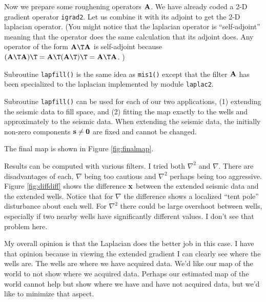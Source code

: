 \par
Now we prepare some roughening operators $\bold A$.
We have already coded a 2-D gradient operator
\texttt{igrad2}.
Let us combine it with its adjoint to get the 2-D laplacian operator.
(You might notice that the laplacian operator is ``self-adjoint'' meaning
that the operator does the same calculation that its adjoint does.
Any operator of the form $\bold A\T\bold A$ is self-adjoint because
$(\bold A\T\bold A)\T=\bold A\T (\bold A\T)\T=\bold A\T\bold A$. )
\par
{} 
Subroutine \texttt{lapfill()}
is the same idea as \texttt{mis1()}
except that 
the filter $\bold A$ has been specialized to the 
laplacian
implemented by module \texttt{laplac2}.



\par
Subroutine \texttt{lapfill()}
can be used for each of our two applications,
(1) extending the seismic data to fill space, and
(2) fitting the map exactly to the wells and approximately to the seismic data.
When extending the seismic data,
the initially non-zero components $\bold s \ne \bold 0$ are fixed
and cannot be changed.
\begin{comment}
That is done by calling
\texttt{lapfill()} with \texttt{mfixed=(s/=0.)}.
When extending wells,
the initially non-zero components $\bold w \ne \bold 0$ are fixed
and cannot be changed.
That is done by calling
\texttt{lapfill()} with \texttt{mfixed=(w/=0.)}.
\end{comment}

\par
The final map is shown in Figure \ref{fig:finalmap}.

\par
Results can be computed with various filters.
I tried both $\nabla^2$ and $\nabla$.
There are disadvantages of each,
$\nabla$ being too cautious and
$\nabla^2$ perhaps being too aggressive.
Figure \ref{fig:diffdiff} shows the difference $\bold x$ between
the extended seismic data and the extended wells.
Notice that for $\nabla$ the difference shows
a localized ``tent pole'' disturbance about each well.
For $\nabla^2$ there could be large overshoot between wells,
especially if two nearby wells have significantly different values.
I don't see that problem here.
\par
My overall opinion is that the Laplacian does the better job in this case.
I have that opinion because in viewing the extended gradient
I can clearly see where the wells are.
The wells are where we have acquired data.
We'd like our map of the world to not show where we acquired data.
Perhaps our estimated map of the world cannot help but show where
we have and have not acquired data, but we'd like to minimize that aspect.
\par
{}


